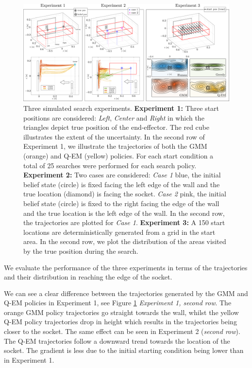 \begin{figure}
    \centering
    \includegraphics[width=\textwidth]{./ch4-PiH/Figures/Results1/Experiment_final_v2.pdf}
    \caption{Three simulated search experiments. \textbf{Experiment 1:} Three start positions are considered: \textit{Left}, \textit{Center} and
     \textit{Right} in which the triangles depict true position of the end-effector. The red cube illustrates the extent of the uncertainty. 
     In the second row of Experiment 1, we illustrate the trajectories of both the GMM (orange) and Q-EM (yellow) policies. For each start condition 
     a total of 25 searches were performed for each search policy. 
     \textbf{Experiment 2:} Two cases are considered: \textit{Case 1} blue, the initial belief state (circle) is fixed facing 
     the left edge of the wall and the true location (diamond) is facing the socket.
     \textit{Case 2} pink, the initial belief state (circle) is fixed to the right facing the edge of the wall and the 
     true location is the left edge of the wall. In the second row, the trajectories are plotted for \textit{Case 1}.
     \textbf{Experiment 3:} A 150 start locations are deterministically generated from a 
     grid in the start area. In the second row, we plot the distribution of the areas visited by the true position during the search.}
    \label{fig:box_exp_sim}
\end{figure}

We evaluate the performance of the three experiments in terms of the trajectories and their distribution in reaching 
the edge of the socket. 

We can see a clear difference between the trajectories generated by the GMM and Q-EM policies in Experiment 1, 
see Figure \ref{fig:box_exp_sim} \textit{Experiment 1, second row}. The orange GMM policy trajectories 
go straight towards the wall, whilst the yellow Q-EM policy trajectories drop in height which results in the trajectories being closer to the socket. 
The same effect can be seen in Experiment 2 (\textit{second row}). The Q-EM trajectories follow a downward trend towards the location of the socket. 
The gradient is less due to the initial starting condition being lower than in Experiment 1. 

